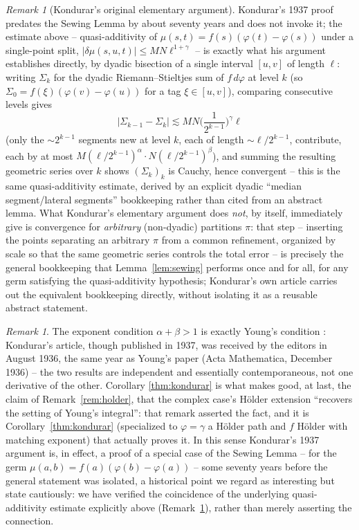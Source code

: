 \documentclass[11pt,fleqn]{article}
\theoremstyle{plain}
\theoremstyle{remark}
\newtheorem{remark}[thm]{Remark}
\begin{document}
\begin{remark}[Kondurar's original elementary argument]\label{rem:kondurar-elementary}
Kondurar's 1937 proof~\cite{K} predates the Sewing Lemma by about seventy
years and does not invoke it; the estimate above -- quasi-additivity of
$\mu(s,t)=f(s)(\varphi(t)-\varphi(s))$ under a single-point split,
$|\delta\mu(s,u,t)|\le MN\ell^{1+\gamma}$ -- is exactly what his argument
establishes directly, by dyadic bisection of a single interval $[u,v]$
of length $\ell$: writing $\Sigma_k$ for the dyadic Riemann--Stieltjes
sum of $f\,d\varphi$ at level $k$ (so $\Sigma_0=f(\xi)(\varphi(v)-\varphi(u))$
for a tag $\xi\in[u,v]$), comparing consecutive levels gives
\[
|\Sigma_{k-1}-\Sigma_k|\lesssim MN\Big(\frac1{2^{k-1}}\Big)^{\gamma}\ell
\]
(only the $\sim2^{k-1}$ segments new at level $k$, each of length
$\sim\ell/2^{k-1}$, contribute, each by at most
$M(\ell/2^{k-1})^\alpha\cdot N(\ell/2^{k-1})^\beta$), and summing the
resulting geometric series over $k$ shows $(\Sigma_k)_k$ is Cauchy, hence
convergent -- this is the same quasi-additivity estimate, derived by an
explicit dyadic ``median segment/lateral segments'' bookkeeping rather
than cited from an abstract lemma. What Kondurar's elementary argument
does \emph{not}, by itself, immediately give is convergence for
\emph{arbitrary} (non-dyadic) partitions $\pi$: that step -- inserting
the points separating an arbitrary $\pi$ from a common refinement,
organized by scale so that the same geometric series controls the total
error -- is precisely the general bookkeeping that Lemma~\ref{lem:sewing}
performs once and for all, for any germ satisfying the quasi-additivity
hypothesis; Kondurar's own article carries out the equivalent
bookkeeping directly, without isolating it as a reusable abstract
statement.
\end{remark}

\begin{remark}
The exponent condition $\alpha+\beta>1$ is exactly Young's condition
\cite{Y}: Kondurar's article, though published in 1937, was received by
the editors in August 1936, the same year as Young's paper (Acta
Mathematica, December 1936) -- the two results are independent and
essentially contemporaneous, not one derivative of the other. Corollary
\ref{thm:kondurar} is what makes good, at last, the claim of
Remark~\ref{rem:holder}, that the complex case's H\"older extension
``recovers the setting of Young's integral'': that remark asserted the
fact, and it is Corollary~\ref{thm:kondurar} (specialized to $\varphi=\gamma$
a H\"older path and $f$ H\"older with matching exponent) that actually
proves it. In this sense Kondurar's 1937 argument is, in effect, a proof
of a special case of the Sewing Lemma -- for the germ
$\mu(a,b)=f(a)(\varphi(b)-\varphi(a))$ -- some seventy years before the
general statement was isolated, a historical point we regard as
interesting but state cautiously: we have verified the coincidence of
the underlying quasi-additivity estimate explicitly above
(Remark~\ref{rem:kondurar-elementary}), rather than merely asserting
the connection.
\end{remark}
\end{document}

